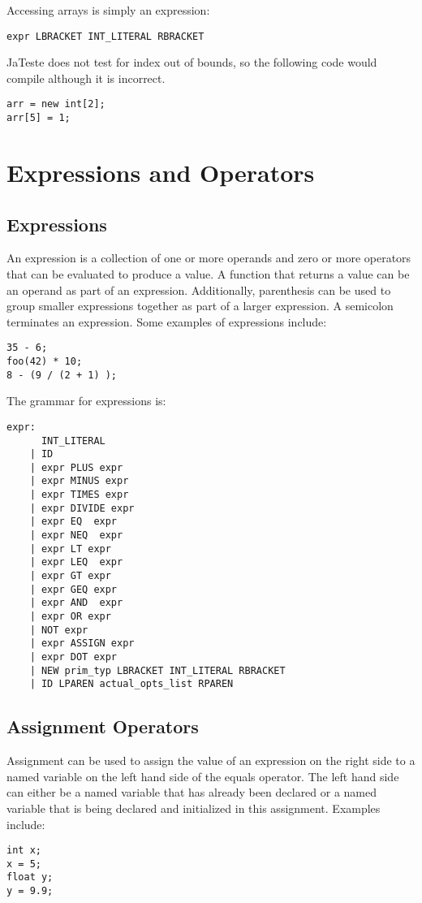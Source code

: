 \documentclass{article}
\begin{document}
Accessing arrays is simply an expression:
\begin{Verbatim}[frame=single]
 expr LBRACKET INT_LITERAL RBRACKET 
\end{Verbatim}


JaTeste does not test for index out of bounds, so the following code would compile although it is incorrect. 

 \begin{lstlisting}
arr = new int[2];
arr[5] = 1;
\end{lstlisting}

\section{Expressions and Operators}

\subsection{Expressions}
An expression is a collection of one or more operands and zero or more operators that can be evaluated to produce a value.  A function that returns a value can be an operand as part of an expression.  Additionally, parenthesis can be used to group smaller expressions together as part of a larger expression.  A semicolon terminates an expression.  Some examples of expressions include:
\begin{lstlisting}
35 - 6;
foo(42) * 10;
8 - (9 / (2 + 1) );
\end{lstlisting}

The grammar for expressions is: 
\begin{Verbatim}[frame=single]
expr:
	  INT_LITERAL 	
	| ID 			
	| expr PLUS expr 
	| expr MINUS expr 	
	| expr TIMES expr 	
	| expr DIVIDE expr 
	| expr EQ  expr 	
	| expr NEQ  expr 	
	| expr LT expr 	
	| expr LEQ  expr 
	| expr GT expr 	
	| expr GEQ expr 
	| expr AND  expr
	| expr OR expr 	
	| NOT expr		
	| expr ASSIGN expr 
	| expr DOT expr 
	| NEW prim_typ LBRACKET INT_LITERAL RBRACKET
	| ID LPAREN actual_opts_list RPAREN
\end{Verbatim}

\subsection{Assignment Operators}
Assignment can be used to assign the value of an expression on the right side to a named variable on the left hand side of the equals operator.  The left hand side can either be a named variable that has already been declared or a named variable that is being declared and initialized in this assignment.  Examples include:
\begin{lstlisting}
int x;
x = 5;
float y;
y = 9.9;
\end{lstlisting}
\end{document}
